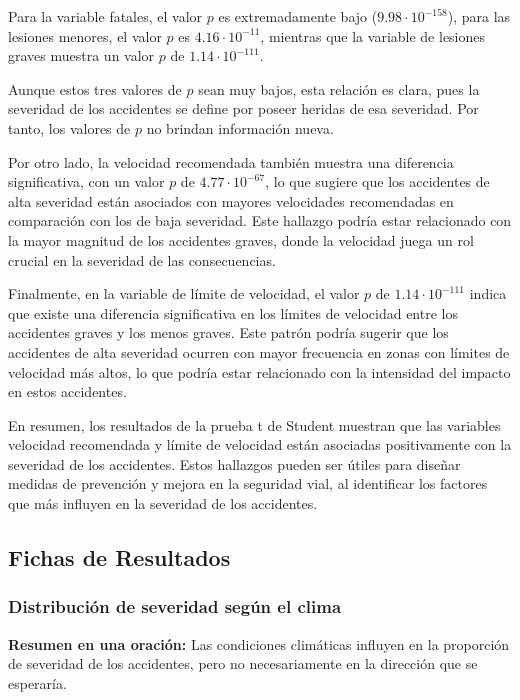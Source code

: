 \documentclass{book}
\begin{document}
Para la variable fatales, el valor \( p \) es extremadamente bajo (\( 9.98 \cdot 10^{-158} \)), para las lesiones menores, el valor \( p \) es \( 4.16 \cdot 10^{-11} \), mientras que la variable de lesiones graves muestra un valor \( p \) de \( 1.14 \cdot 10^{-111} \).

Aunque estos tres valores de \( p \) sean muy bajos, esta relación es clara, pues la severidad de los accidentes se define por poseer heridas de esa severidad. Por tanto, los valores de \( p \) no brindan información nueva.

Por otro lado, la velocidad recomendada también muestra una diferencia significativa, con un valor \( p \) de \( 4.77 \cdot 10^{-67} \), lo que sugiere que los accidentes de alta severidad están asociados con mayores velocidades recomendadas en comparación con los de baja severidad. Este hallazgo podría estar relacionado con la mayor magnitud de los accidentes graves, donde la velocidad juega un rol crucial en la severidad de las consecuencias.

Finalmente, en la variable de límite de velocidad, el valor \( p \) de \( 1.14 \cdot 10^{-111} \) indica que existe una diferencia significativa en los límites de velocidad entre los accidentes graves y los menos graves. Este patrón podría sugerir que los accidentes de alta severidad ocurren con mayor frecuencia en zonas con límites de velocidad más altos, lo que podría estar relacionado con la intensidad del impacto en estos accidentes.

En resumen, los resultados de la prueba t de Student muestran que las variables velocidad recomendada y límite de velocidad están asociadas positivamente con la severidad de los accidentes. Estos hallazgos pueden ser útiles para diseñar medidas de prevención y mejora en la seguridad vial, al identificar los factores que más influyen en la severidad de los accidentes.






\newpage
\subsection{Fichas de Resultados}

\subsubsection{Distribución de severidad según el clima}

\textbf{Resumen en una oración:} Las condiciones climáticas influyen en la proporción de severidad de los accidentes, pero no necesariamente en la dirección que se esperaría.
\end{document}
